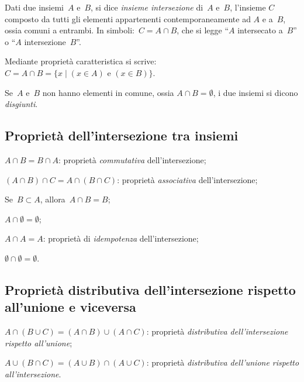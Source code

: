 \begin{definizione}
Dati due insiemi~$A$ e~$B$, si dice \emph{insieme intersezione} di~$A$ e~$B$, l'insieme
$C$ composto da tutti gli elementi appartenenti contemporaneamente ad
$A$ e a~$B$, ossia comuni a entrambi.
In simboli:~$C=A\cap B$, che si legge
``$A$ intersecato a~$B$'' o ``$A$ intersezione~$B$''.
\end{definizione}
\begin{center}
 
\end{center}
Mediante proprietà caratteristica si scrive:~$C=A\cap B=\{x\mid (x\in A)\text{ e }(x\in B)\}$.

Se~$A$ e~$B$ non hanno elementi in comune,
ossia $A\cap B=\emptyset $, i due insiemi si dicono \emph{disgiunti}.

\subsection{Proprietà dell'intersezione tra insiemi}

\begin{enumeratea}
\item $A\cap B=B\cap A$: proprietà \emph{commutativa} dell'intersezione;
\item $(A\cap B)\cap C=A\cap (B\cap C)$: proprietà \emph{associativa} dell'intersezione;
\item Se~$B\subset A$, allora~$A\cap B=B$;
\item $A\cap \emptyset =\emptyset$;
\item $A\cap A=A$: proprietà di \emph{idempotenza} dell'intersezione;
\item $\emptyset \cap \emptyset =\emptyset$.
\end{enumeratea}

\subsection[Proprietà distributiva dell'intersezione]{Proprietà distributiva dell'intersezione rispetto all'unione e viceversa}

\begin{enumeratea}
\item $A\cap (B\cup C)=(A\cap B)\cup (A\cap C)$: proprietà \emph{distributiva dell'intersezione rispetto all'unione};
\item $A\cup (B\cap C)=(A\cup B)\cap (A\cup C)$: proprietà \emph{distributiva dell'unione rispetto all'intersezione}.
\end{enumeratea}

